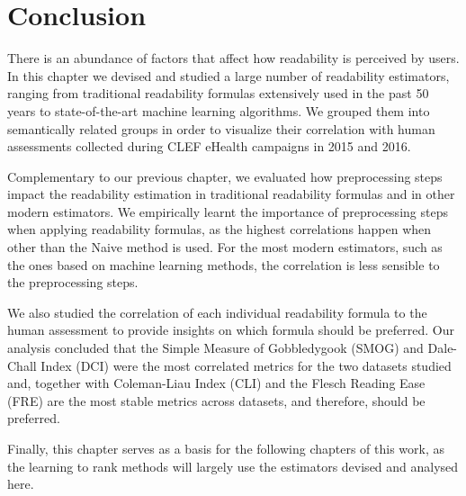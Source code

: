 \section{Conclusion}
\label{sec:conclusion_doc_analysis}

There is an abundance of factors that affect how readability is perceived by users. 
In this chapter we devised and studied a large number of readability estimators, ranging from traditional readability formulas extensively used in the past 50 years to state-of-the-art machine learning algorithms.
We grouped them into semantically related groups in order to visualize their correlation with human assessments collected during CLEF eHealth campaigns in 2015 and 2016.

Complementary to our previous chapter, we evaluated how preprocessing steps impact the readability estimation in traditional readability formulas and in other modern estimators. We empirically learnt the importance of preprocessing steps when applying readability formulas, as the highest correlations happen when other than the Naive method is used.
For the most modern estimators, such as the ones based on machine learning methods, the correlation is less sensible to the preprocessing steps.

We also studied the correlation of each individual readability formula to the human assessment to provide insights on which formula should be preferred. Our analysis concluded that the Simple Measure of Gobbledygook (SMOG) and Dale-Chall Index (DCI) were the most correlated metrics for the two datasets studied and, together with Coleman-Liau Index (CLI) and the Flesch Reading Ease (FRE) are the most stable metrics across datasets, and therefore, should be preferred.

Finally, this chapter serves as a basis for the following chapters of this work, as the learning to rank methods will largely use the estimators devised and analysed here.



